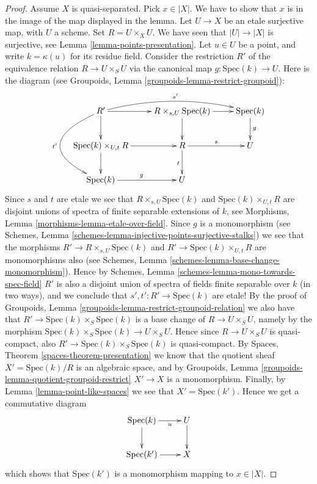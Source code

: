 \begin{proof}
\medskip\noindent
Assume $X$ is quasi-separated. Pick $x \in |X|$. We have to show that
$x$ is in the image of the map displayed in the lemma.
Let $U \to X$ be an etale surjective map, with $U$ a scheme.
Set $R = U \times_X U$. We have seen that $|U| \to |X|$ is surjective,
see Lemma \ref{lemma-points-presentation}.
Let $u \in U$ be a point, and write $k =\kappa(u)$
for its residue field. Consider the restriction $R'$
of the equivalence relation $R \to U \times_S U$ via the canonical map
$g : \text{Spec}(k) \to U$.
Here is the diagram (see
Groupoids, Lemma \ref{groupoids-lemma-restrict-groupoid}):
$$
\xymatrix{
R' \ar[d] \ar[r] \ar@/_4pc/[dd]_{t'} \ar@/^1pc/[rr]^{s'} &
R \times_{s, U} \text{Spec}(k) \ar[r] \ar[d] &
\text{Spec}(k) \ar[d]^g \\
\text{Spec}(k) \times_{U, t} R \ar[d] \ar[r] &
R \ar[r]^s \ar[d]_t &
U \\
\text{Spec}(k) \ar[r]^g &
U
}
$$
Since $s$ and $t$ are etale we see that
$R \times_{s, U} \text{Spec}(k)$ and
$\text{Spec}(k) \times_{U,t} R$ are disjoint unions of spectra
of finite separable extensions of $k$, see
Morphisms, Lemma \ref{morphisms-lemma-etale-over-field}.
Since $g$ is a monomorphism (see
Schemes, Lemma \ref{schemes-lemma-injective-points-surjective-stalks})
we see that the morphisms $R' \to R \times_{s, U} \text{Spec}(k)$
and $R' \to \text{Spec}(k) \times_{U,t} R$ are monomorphisms
also (see Schemes, Lemma \ref{schemes-lemma-base-change-monomorphism}).
Hence by Schemes, Lemma \ref{schemes-lemma-mono-towards-spec-field}
$R'$ is also a disjoint union of spectra of fields finite separable
over $k$ (in two ways),
and we conclude that $s', t' : R' \to \text{Spec}(k)$ are etale!
By the proof of
Groupoids, Lemma \ref{groupoids-lemma-restrict-groupoid-relation}
we also have that $R' \to \text{Spec}(k) \times_S \text{Spec}(k)$ is a base
change of $R \to U \times_S U$, namely by the morphism
$\text{Spec}(k) \times_S \text{Spec}(k) \to U \times_S U$.
Hence since $R \to U \times_S U$ is quasi-compact, also
$R' \to \text{Spec}(k) \times_S \text{Spec}(k)$ is quasi-compact.
By Spaces, Theorem \ref{spaces-theorem-presentation}
we know that the quotient sheaf
$X' = \text{Spec}(k)/R$ is an algebraic space, and by
Groupoids, Lemma \ref{groupoids-lemma-quotient-groupoid-restrict}
$X' \to X$ is a monomorphism.
Finally, by Lemma \ref{lemma-point-like-spaces}
we see that $X' = \text{Spec}(k')$. Hence we get a commutative diagram
$$
\xymatrix{
\text{Spec}(k) \ar[r]_-u \ar[d] & U \ar[d] \\
\text{Spec}(k') \ar[r] & X
}
$$
which shows that $\text{Spec}(k')$ is a monomorphism mapping
to $x \in |X|$.
\end{proof}











